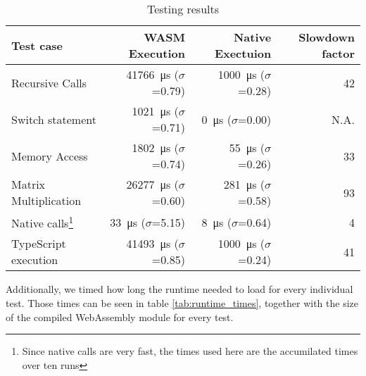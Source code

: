 \begin{table}[h]
    \begin{tabular}{l | r r r}
        Test case                                                                                                            & WASM Execution                                   & Native Exectuion                                & Slowdown factor \\
        \hline
        Recursive Calls                                                                                                      & \SI{41766}{\micro\second} ($\sigma$=\SI{0.79}{}) & \SI{1000}{\micro\second} ($\sigma$=\SI{0.28}{}) & \SI{42}{}       \\
        Switch statement                                                                                                     & \SI{1021}{\micro\second} ($\sigma$=\SI{0.71}{})  & \SI{0}{\micro\second} ($\sigma$=\SI{0.00}{})    & N.A.            \\
        Memory Access                                                                                                        & \SI{1802}{\micro\second} ($\sigma$=\SI{0.74}{})  & \SI{55}{\micro\second} ($\sigma$=\SI{0.26}{})   & \SI{33}{}       \\
        Matrix Multiplication                                                                                                & \SI{26277}{\micro\second} ($\sigma$=\SI{0.60}{}) & \SI{281}{\micro\second} ($\sigma$=\SI{0.58}{})  & \SI{93}{}       \\
        Native calls\footnote{Since native calls are very fast, the times used here are the accumilated times over ten runs} & \SI{33}{\micro\second} ($\sigma$=\SI{5.15}{})    & \SI{8}{\micro\second} ($\sigma$=\SI{0.64}{})    & \SI{4}{}        \\
        TypeScript execution                                                                                                 & \SI{41493}{\micro\second} ($\sigma$=\SI{0.85}{}) & \SI{1000}{\micro\second} ($\sigma$=\SI{0.24}{}) & \SI{41}{}       \\
    \end{tabular}
    \caption{Testing results}
    \label{tab:testing_times}
\end{table}

Additionally, we timed how long the runtime needed to load for every individual test. Those times can be seen in table \ref{tab:runtime_times}, together with the size of the compiled WebAssembly module for every test.

